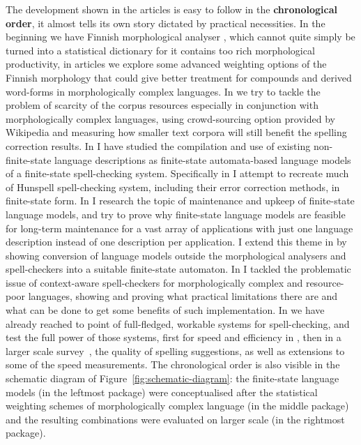 \documentclass[officiallayout]{unihelcompling}
\begin{document}
The development shown in the articles is easy to follow in the
\textbf{chronological order}, it almost tells its own story dictated by
practical necessities. In the beginning we have Finnish morphological analyser
\citep{pirinen2008suomen}, which cannot quite simply be turned into a
statistical dictionary for it contains too rich morphological productivity, in
articles  we explore some
advanced weighting options of the Finnish morphology that could give better
treatment for compounds and derived word-forms in morphologically complex
languages. In  we try to tackle the problem
of scarcity of the corpus resources especially in conjunction with
morphologically complex languages, using crowd-sourcing option provided by
Wikipedia and measuring how smaller text corpora will still benefit the
spelling correction results. In
 I have studied the
compilation and use of existing non-finite-state language descriptions as
finite-state automata-based language models of a finite-state spell-checking
system.  Specifically in  I attempt to recreate
much of Hunspell spell-checking system, including their error correction
methods, in finite-state form. In  I
research the topic of maintenance and upkeep of finite-state language models,
and try to prove why finite-state language models are feasible for long-term
maintenance for a vast array of applications with just one language description
instead of one description per application.  I extend this theme in
 by showing conversion of language models
outside the morphological analysers and spell-checkers into a suitable
finite-state automaton. In  I tackled the
problematic issue of context-aware spell-checkers for morphologically complex
and resource-poor languages, showing and proving what practical limitations
there are and what can be done to get some benefits of such implementation. In
 we have already reached to
point of full-fledged, workable systems for spell-checking, and test the full
power of those systems, first for speed and efficiency in
, then in a larger scale
survey~, the quality of spelling suggestions, as
well as extensions to some of the speed measurements.
The chronological order is also visible in the schematic diagram of
Figure~\ref{fig:schematic-diagram}: the finite-state language models (in the
leftmost package) were conceptualised after the statistical weighting schemes
of morphologically complex language (in the middle package) and the resulting
combinations were evaluated on larger scale (in the rightmost package).
\end{document}
